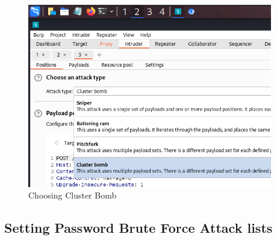 \documentclass[11pt]{article}
\begin{document}
\begin{figure}[H]
    \centering
    \includegraphics[width=0.95\textwidth]{burpsuite (5).png}
    \caption{Choosing Cluster Bomb}
    \label{fig:1}
\end{figure}
\subsection{Setting Password Brute Force Attack lists}



\end{document}
